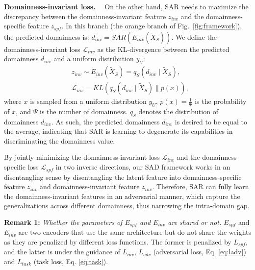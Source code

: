 \documentclass[10pt,journal,compsoc]{IEEEtran}
\renewcommand{\paragraph}[1]{\noindent\textbf{#1}~~}
\begin{document}
\paragraph{Domainness-invariant loss.}
 On the other hand, SAR needs to maximize the discrepancy between the domainness-invariant feature $z_{inv}$ and the domainness-specific feature $z_{spf}$. In this branch (the orange branch of Fig.~\ref{fig:framework}), the predicted domainness is: $d_{inv}=SAR(E_{inv}(\tilde{X}_{S}))$. We define the domainness-invariant loss $\mathcal{L}_{inv}$ as the KL-divergence between the predicted domainness $d_{inv}$ and a uniform distribution $y_{U}$: 
\begin{equation}
    \begin{aligned}
    \label{eq:domainness-inv}
&z_{inv} \sim E_{inv}\left(\tilde{X}_{S}\right) =q_{S}\left(d_{inv} \mid \tilde{X}_{S}\right), \\
&\mathcal{L}_{inv} = KL\left(q_{S}\left(d_{inv} \mid \tilde{X}_{S}\right) \| p\left(x\right) \right),
\end{aligned}
\end{equation}
where $x$ is sampled from a uniform  distribution $y_{U}$, $p(x)=\frac{1}{\Psi}$ is the probability of $x$, and $\Psi$ is the number of domainness.
$q_{S}$ denotes the distribution of domainness $d_{inv}$. As such, the predicted domainness $d_{inv}$ is desired to be equal to the average, indicating that SAR is learning to degenerate its capabilities in discriminating the domainness value. 

By jointly minimizing the domainness-invariant loss $\mathcal{L}_{inv}$ and the domainness-specific loss $\mathcal{L}_{spf}$ in two inverse directions, our SAD framework works in an disentangling sense by disentangling the latent feature into domainness-specific feature $z_{inv}$ and domainness-invariant feature $z_{inv}$. Therefore,
SAR can fully learn the domainness-invariant features in an adversarial manner, which capture the generalizations across different domainness, thus narrowing the intra-domain gap. 


\noindent \textbf{Remark 1:} \textit{Whether the parameters of $E_{spf}$ and $E_{inv}$ are shared or not.} $E_{spf}$ and $E_{inv}$ are two encoders that use the same architecture but do not share the weights as they are penalized by different loss functions. The former is penalized by $L_{spf}$, and the latter is under the guidance of $L_{inv}$, $L_{adv}$ (adversarial loss, Eq. \eqref{eq:ladv}) and $L_{task}$ (task loss, Eq. \eqref{eq:task}).
\end{document}
